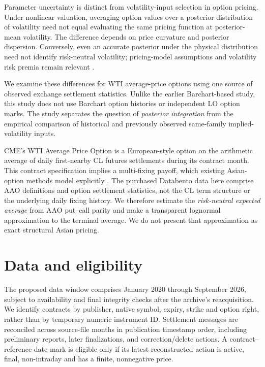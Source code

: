 \documentclass[a4paper,fleqn]{cas-dc}
\begin{document}
Parameter uncertainty is distinct from volatility-input selection in
option pricing. Under nonlinear valuation, averaging option values
over a posterior distribution of volatility need not equal evaluating
the same pricing function at posterior-mean volatility. The difference
depends on price curvature and posterior dispersion. Conversely, even
an accurate posterior under the physical distribution need not identify
risk-neutral volatility; pricing-model assumptions and volatility risk
premia remain relevant \citep{guidolin2003,romboutsstentoft2014}.

We examine these differences for WTI average-price options using
one source of observed exchange settlement statistics.
Unlike the earlier Barchart-based study, this study does not use
Barchart option histories or independent LO option marks.
The study separates the question of \emph{posterior integration}
from the empirical comparison of historical and previously observed
same-family implied-volatility inputs.

CME's WTI Average Price Option is a European-style option on the
arithmetic average of daily first-nearby CL futures settlements
during its contract month. This contract specification implies a
multi-fixing payoff, which existing Asian-option methods model
explicitly \citep{kemnavorst1990,curran1994,kahale2020}.
The purchased Databento data here comprise AAO definitions
and option settlement statistics, not the CL term structure or the
underlying daily fixing history. We therefore estimate the
\emph{risk-neutral expected average} from AAO put--call parity and
make a transparent lognormal approximation to the terminal average.
We do not present that approximation as exact structural Asian pricing.

\section{Data and eligibility}
\label{sec:db_data}

The proposed data window comprises January 2020 through September
2026, subject to availability and final integrity checks after
the archive's reacquisition. We identify contracts by publisher,
native symbol, expiry, strike and option right, rather than by
temporary numeric instrument ID. Settlement messages are reconciled
across source-file months in publication timestamp order, including
preliminary reports, later finalizations, and correction/delete
actions. A contract--reference-date mark is eligible only if its
latest reconstructed action is active, final, non-intraday and
has a finite, nonnegative price.
\end{document}
